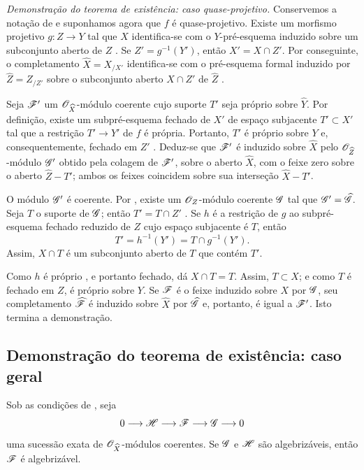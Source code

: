 \begin{env}[5.2.6]
\label{III.5.2.6}
\emph{Demonstração do teorema de existência: caso quase-projetivo.}
Conservemos a notação de  e suponhamos agora que $f$
é quase-projetivo. Existe um morfismo projetivo
$g:Z\to Y$ tal que $X$ identifica-se com o $Y$-pré-esquema
induzido sobre um subconjunto aberto de $Z$ . Se
$Z'=g^{-1}(Y')$, então $X'=X\cap Z'$. Por conseguinte, o completamento
$\widehat{X}=X_{/X'}$ identifica-se com o pré-esquema formal
induzido por $\widehat{Z}=Z_{/Z'}$ sobre o subconjunto aberto $X\cap Z'$ de
$\widehat{Z}$ .

Seja $\mathscr{F}'$ um $\mathscr{O}_{\widehat{X}}$-módulo coerente cujo
suporte $T'$ seja próprio sobre $\widehat{Y}$. Por definição, existe
um subpré-esquema fechado de $X'$ de espaço subjacente
$T'\subset X'$ tal que a restrição $T'\to Y'$ de $f$ é
própria. Portanto, $T'$ é próprio sobre $Y$ e, consequentemente, fechado em
$Z'$ . Deduz-se que $\mathscr{F}'$ é induzido
sobre $\widehat{X}$ pelo $\mathscr{O}_{\widehat{Z}}$-módulo $\mathscr{G}'$
obtido pela colagem de $\mathscr{F}'$, sobre o aberto $\widehat{X}$, com o
feixe zero sobre o aberto $\widehat{Z}-T'$; ambos os feixes coincidem sobre
sua interseção $\widehat{X}-T'$.

O módulo $\mathscr{G}'$ é coerente. Por , existe um
$\mathscr{O}_Z$-módulo coerente $\mathscr{G}$ tal que
$\mathscr{G}'=\widehat{\mathscr{G}}$. Seja $T$ o suporte de $\mathscr{G}$;
então $T'=T\cap Z'$ . Se $h$ é a restrição
de $g$ ao subpré-esquema fechado reduzido de $Z$ cujo espaço subjacente
é $T$, então
\[
  T'=h^{-1}(Y')=T\cap g^{-1}(Y').
\]
Assim, $X\cap T$ é um subconjunto aberto de $T$ que contém $T'$.

Como $h$ é próprio , e portanto fechado,
 dá $X\cap T=T$. Assim, $T\subset X$; e
como $T$ é fechado em $Z$, é próprio sobre $Y$. Se $\mathscr{F}$ é
o feixe induzido sobre $X$ por $\mathscr{G}$, seu completamento
$\widehat{\mathscr{F}}$ é induzido sobre $\widehat{X}$ por
$\widehat{\mathscr{G}}$  e, portanto, é igual a
$\mathscr{F}'$. Isto termina a demonstração.
\end{env}


\subsection{Demonstração do teorema de existência: caso geral}
\label{subsection:III.5.3}

\begin{lemma}[5.3.1]
\label{III.5.3.1}
Sob as condições de , seja
\[
  0\longrightarrow\mathscr{H}\longrightarrow\mathscr{F}
  \longrightarrow\mathscr{G}\longrightarrow0
\]
uma sucessão exata de $\mathscr{O}_{\widehat{X}}$-módulos coerentes.
Se $\mathscr{G}$ e $\mathscr{H}$ são algebrizáveis, então $\mathscr{F}$ é
algebrizável.
\end{lemma}

